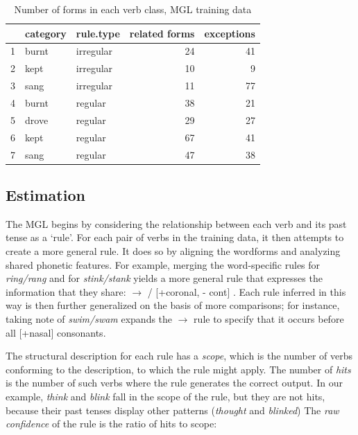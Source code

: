 \documentclass[12pt]{article}
\begin{document}
\begin{table}[ht]
\centering
\begin{tabular}{rllrr}
  \hline
 & category & rule.type & related forms & exceptions \\ 
  \hline
1 & burnt & irregular &  24 &  41 \\ 
  2 & kept & irregular &  10 &   9 \\ 
  3 & sang & irregular &  11 &  77 \\ 
  4 & burnt & regular &  38 &  21 \\ 
  5 & drove & regular &  29 &  27 \\ 
  6 & kept & regular &  67 &  41 \\ 
  7 & sang & regular &  47 &  38 \\ 
   \hline
\end{tabular}
\caption{Number of forms in each verb class, MGL training data} 
\label{mglsetsize}
\end{table}
\subsection{Estimation}

The MGL begins by considering the relationship between each verb and its past tense as a `rule'. For each pair of verbs in the training data, it then attempts to create a more general rule. It does so by aligning the wordforms and analyzing shared phonetic features. For example,  merging the word-specific rules for {\em ring/rang} and for {\em stink/stank} yields a more general rule that expresses the information that they share: \textipa{[I]} $\rightarrow{}$\textipa{[\ae]} / [+coronal, - cont] \underline{\hspace{0.5cm}} \textipa{[N]}. Each rule inferred in this way is then further generalized on the basis of more comparisons; for instance, taking note of {\em swim/swam} expands the \textipa{[I]} $\rightarrow{}$\textipa{[\ae]} rule to specify that it occurs before all [+nasal] consonants. 

The structural description for each rule has a {\em scope}, which is the number of verbs conforming to the description, to which the rule might apply. The number of {\em hits} is the number of such verbs where the rule generates the correct output. In our example, {\em think} and {\em blink} fall in the scope of the rule, but they are not hits, because their past tenses display other patterns ({\em thought} and {\em blinked})
The {\it raw confidence} of the rule is the ratio of hits to scope: 
\end{document}
